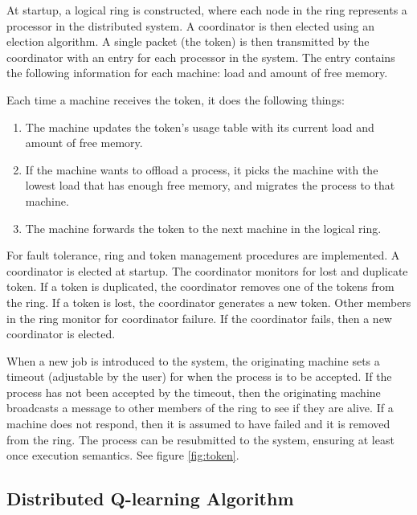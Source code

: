 \documentclass{report}
\begin{document}
At startup, a logical ring is constructed, where each node in the ring
represents a processor in the distributed system.  A coordinator is then
elected using an election algorithm.  A single packet (the token) is then
transmitted by the coordinator with an entry for each processor in the
system.  The entry contains the following information for each machine: load
and amount of free memory.

Each time a machine receives the token, it does the following things:

\begin{enumerate}
  \item The machine updates the token's usage table with its current load
  and amount of free memory.

  \item If the machine wants to offload a process, it picks the machine with
  the lowest load that has enough free memory, and migrates the
  process to that machine.  

  \item The machine forwards the token to the next machine in the logical
  ring. 
\end{enumerate}


For fault tolerance, ring and token management procedures are implemented.
A coordinator is elected at startup.  The coordinator monitors for lost and
duplicate token.  If a token is duplicated, the coordinator removes one of
the tokens from the ring.  If a token is lost, the coordinator generates a
new token.  Other members in the ring monitor for coordinator failure. If
the coordinator fails, then a new coordinator is elected.

When a new job is introduced to the system, the originating machine sets a
timeout (adjustable by the user) for when the process is to be accepted.  If
the process has not been accepted by the timeout, then the originating
machine broadcasts a message to other members of the ring to see if they are
alive.  If a machine does not respond, then it is assumed to have failed and
it is removed from the ring.  The process can be resubmitted to the system,
ensuring at least once execution semantics.  See figure \ref{fig:token}.



\subsection{Distributed Q-learning Algorithm}
\end{document}
